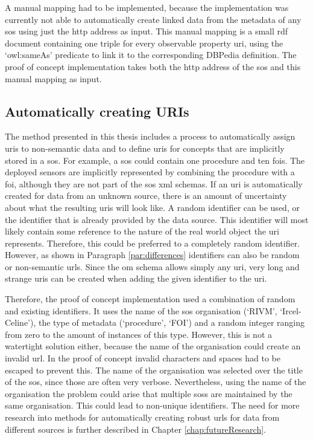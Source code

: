  A manual mapping had to be implemented, because the implementation was currently not able to automatically create linked data from the metadata of any \ac{sos} using just the \ac{http} address as input. This manual mapping is a small \ac{rdf} document containing one triple for every observable property \ac{uri}, using the `owl:sameAs' predicate to link it to the corresponding DBPedia definition. The proof of concept implementation takes both the \ac{http} address of the \ac{sos} and this manual mapping as input.          

\subsection{Automatically creating URIs}
The method presented in this thesis includes a process to automatically assign \acp{uri} to non-semantic data and to define \acp{uri} for concepts that are implicitly stored in a \ac{sos}. For example, a \ac{sos} could contain one procedure and ten \acp{foi}. The deployed sensors are implicitly represented by combining the procedure with a \ac{foi}, although they are not part of the \ac{sos} \ac{xml} schemas. If an \ac{uri} is automatically created for data from an unknown source, there is an amount of uncertainty about what the resulting \acp{uri} will look like. A random identifier can be used, or the identifier that is already provided by the data source. This identifier will most likely contain some reference to the nature of the real world object the \ac{uri} represents. Therefore, this could be preferred to a completely random identifier. However, as shown in Paragraph \ref{par:differences} identifiers can also be random or non-semantic \acp{url}. Since the \ac{om} schema allows simply any \ac{uri}, very long and strange \acp{uri} can be created when adding the given identifier to the \ac{uri}. 

Therefore, the proof of concept implementation used a combination of random and existing identifiers. It uses the name of the \ac{sos} organisation (`RIVM', `Ircel-Celine'), the type of metadata (`procedure', `FOI') and a random integer ranging from zero to the amount of instances of this type. However, this is not a watertight solution either, because the name of the organisation could create an invalid \ac{url}. In the proof of concept invalid characters and spaces had to be escaped to prevent this. The name of the organisation was selected over the title of the \ac{sos}, since those are often very verbose. Nevertheless, using the name of the organisation the problem could arise that multiple \aclp{sos} are maintained by the same organisation. This could lead to non-unique identifiers. The need for more research into methods for automatically creating robust \acp{url} for data from different sources is further described in Chapter \ref{chap:futureResearch}.      

